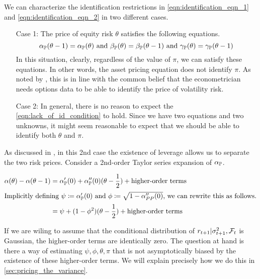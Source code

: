 \documentclass[11pt, letterpaper, twoside, final]{article}
\begin{document}
We can characterize the identification restrictions in \cref{eqn:identification_eqn_1} and
\cref{eqn:identification_eqn_2} in two different cases.   

\begin{enumerate}
    \item[Case 1:] The price of equity risk $\theta$ satisfies the following equations. 
        \begin{equation}
            \alpha_{\PP}(\theta - 1) = \alpha_{\PP}(\theta)\ \text{and}\ \beta_{\PP}(\theta) = \beta_{\PP}(\theta
            -1)\ \text{and}\ \gamma_{\PP}(\theta) = \gamma_{\PP}(\theta - 1)
            \label{eqn:lack_of_id_condition}
        \end{equation}
        In this situation, clearly, regardless of the value of $\pi$, we can satisfy these equations.
        In other words, the asset pricing equation does not identify $\pi$. 
        As noted by \textcite{khrapov2016affine}, this is in line with the common belief that the econometrician
        needs options data to be able to identify the price of volatility risk. 
    \item[Case 2:] 
        In general, there is no reason to expect the \cref{eqn:lack_of_id_condition} to hold.
        Since we have two equations and two unknowns, it might seem reasonable to expect that we should be able to
        identify both $\theta$ and $\pi$.
\end{enumerate}


As discussed in \textcite[13]{khrapov2016affine}, in this 2nd case the existence of leverage allows us to
separate the two risk prices.
Consider a 2nd-order Taylor series expansion of $\alpha_{\mathbb{P}}$.

\begin{align}
    \alpha(\theta) - \alpha(\theta - 1) &= \alpha_{\mathbb{P}}'(0) + \alpha_{\mathbb{P}}''(0) (\theta - \frac{1}{2}) +
    \text{higher-order terms}  \\
    \intertext{Implicitly defining $\psi \coloneqq \alpha_{\mathbb{P}}'(0)$ and $\phi \coloneqq \sqrt{1 -
        \alpha_{PP}''(0)}$, we can rewrite this as follows.} 
        &=  \psi + (1 - \phi^2) (\theta - \frac{1}{2}) + \text{higher-order terms}  
\end{align}

If we are wiling to assume that the conditional distribution of $r_{t+1} \vert \sigma^2_{t+1}, \mathcal{F}_t$ is Gaussian,
the higher-order terms are identically zero.
The question at hand is there a way of estimating $\psi, \phi, \theta, \pi$ that is not asymptotically biased by
the existence of these higher-order terms.
We will explain precisely how we do this in \cref{sec:pricing_the_variance}.
\end{document}
